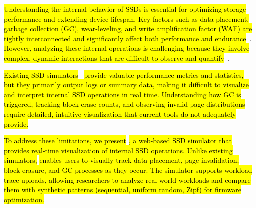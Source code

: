 \documentclass{ieeeaccess}
\begin{document}
\hl{Understanding the internal behavior of SSDs is essential for optimizing storage performance and extending device lifespan. Key factors such as data placement, garbage collection (GC), wear-leveling, and write amplification factor (WAF) are tightly interconnected and significantly affect both performance and endurance}~\cite{multistreamssd-hotstorage14, SEPBIT-usenixFAST, MiDAS-usenixFAST}. \hl{However, analyzing these internal operations is challenging because they involve complex, dynamic interactions that are difficult to observe and quantify}~\cite{allocation-strategy-ics11, greedy-garbage-collection-PE11, Over-Provisioning-IEEE22}.

\hl{Existing SSD simulators}~\cite{MQSim-USENIX18, SSDModel-USENIX-TC-08, SSDSim-ICS-11, NANDFlashSim-TOS-16, VSSIM-MSST-13, WiscSim-EuroSys-17, SimpleSSD-IEEE18, FEMU-FAST-18, FTLSim-ACM-2017} \hl{provide valuable performance metrics and statistics, but they primarily output logs or summary data, making it difficult to visualize and interpret internal SSD operations in real time. Understanding how GC is triggered, tracking block erase counts, and observing invalid page distributions require detailed, intuitive visualization that current tools do not adequately provide.}

\hl{To address these limitations, we present} \eyanassdsim\hl{, a web-based SSD simulator that provides real-time visualization of internal SSD operations. Unlike existing simulators,} \eyanassdsim \hl{enables users to visually track data placement, page invalidation, block erasure, and GC processes as they occur. The simulator supports workload trace uploads, allowing researchers to analyze real-world workloads and compare them with synthetic patterns (sequential, uniform random, Zipf) for firmware optimization.}
\end{document}
